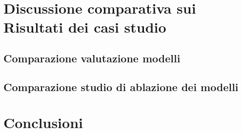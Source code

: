 \documentclass[a4paper,12pt]{report}
\begin{document}
	\chapter{Discussione comparativa sui Risultati dei casi studio}
	
	\section{Comparazione valutazione modelli}
	
	\section{Comparazione studio di ablazione dei modelli}
	
	\chapter{Conclusioni}
	
\end{document}
